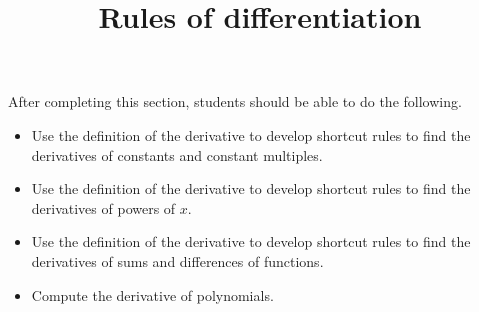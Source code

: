 \documentclass{ximera}
\title{Rules of differentiation}
\begin{document}
\begin{abstract}
\end{abstract}

\maketitle

\begin{sectionOutcomes}

After completing this section, students should be able to do the following.

\begin{itemize}
	\item Use the definition of the derivative to develop shortcut rules to find the derivatives of constants and constant multiples.
	\item Use the definition of the derivative to develop shortcut rules to find the derivatives of powers of $x$.
	\item Use the definition of the derivative to develop shortcut rules to find the derivatives of sums and differences of functions.
        \item Compute the derivative of polynomials.
     \end{itemize}

\end{sectionOutcomes}
\end{document}
